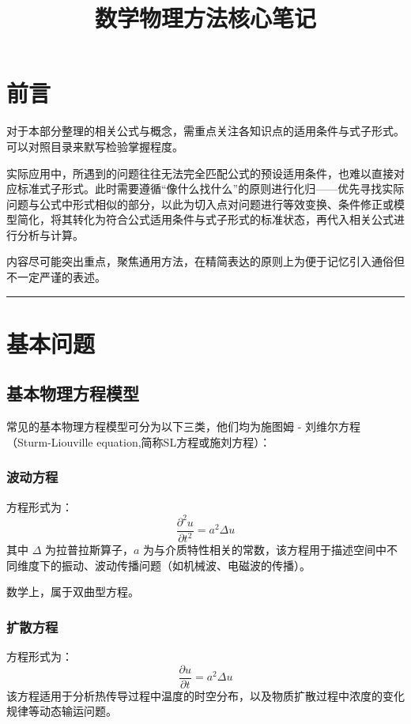 \documentclass{article}
\title{\textbf{数学物理方法核心笔记}}
\author{}
\date{}
\begin{document}
	\maketitle
	\section*{前言}

	
	对于本部分整理的相关公式与概念，需重点关注各知识点的适用条件与式子形式。可以对照目录来默写检验掌握程度。
	
	实际应用中，所遇到的问题往往无法完全匹配公式的预设适用条件，也难以直接对应标准式子形式。此时需要遵循“像什么找什么”的原则进行化归——优先寻找实际问题与公式中形式相似的部分，以此为切入点对问题进行等效变换、条件修正或模型简化，将其转化为符合公式适用条件与式子形式的标准状态，再代入相关公式进行分析与计算。
	
	内容尽可能突出重点，聚焦通用方法，在精简表达的原则上为便于记忆引入通俗但不一定严谨的表述。	


	\pagebreak

	\tableofcontents
	\vspace{1cm}
	\hrule  %
	\vspace{1cm}
	
	
	
	\pagebreak
	
	

	
	
	\section{基本问题}
	
	\subsection{基本物理方程模型}
	常见的基本物理方程模型可分为以下三类，他们均为施图姆 - 刘维尔方程（Sturm-Liouville equation,简称SL方程或施刘方程）：
	
	\subsubsection{波动方程}
	方程形式为：
	\[
	 \frac{\partial^2 u}{\partial t^2} = a^2\Delta u 
	\]
	其中 $\Delta$ 为拉普拉斯算子，$a$ 为与介质特性相关的常数，该方程用于描述空间中不同维度下的振动、波动传播问题（如机械波、电磁波的传播）。
	
	数学上，属于双曲型方程。
	
	\subsubsection{扩散方程}
	方程形式为：
	\[
	 \frac{\partial u}{\partial t} = a^2\Delta u 
	\]
	该方程适用于分析热传导过程中温度的时空分布，以及物质扩散过程中浓度的变化规律等动态输运问题。
	
\end{document}

